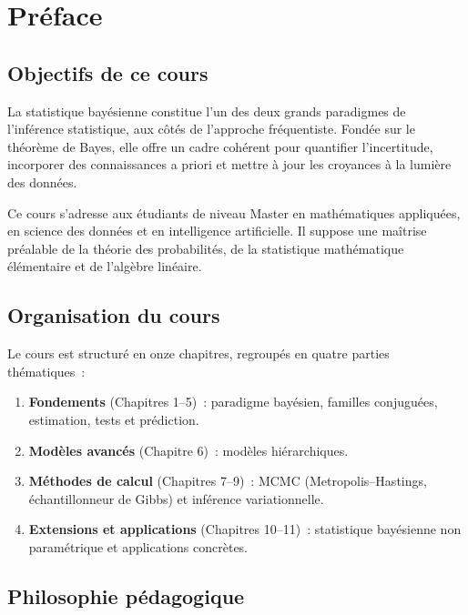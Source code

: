 \chapter*{Pr\'eface}

\section*{Objectifs de ce cours}

La statistique bay\'esienne constitue l'un des deux grands paradigmes
de l'inf\'erence statistique, aux c\^ot\'es de l'approche fr\'equentiste.
Fond\'ee sur le th\'eor\`eme de Bayes, elle offre un cadre coh\'erent
pour quantifier l'incertitude, incorporer des connaissances a priori
et mettre \`a jour les croyances \`a la lumi\`ere des donn\'ees.

Ce cours s'adresse aux \'etudiants de niveau Master en math\'ematiques
appliqu\'ees, en science des donn\'ees et en intelligence artificielle.
Il suppose une ma\^itrise pr\'ealable de la th\'eorie des probabilit\'es,
de la statistique math\'ematique \'el\'ementaire et de l'alg\`ebre lin\'eaire.

\section*{Organisation du cours}

Le cours est structur\'e en onze chapitres, regroup\'es en quatre parties
th\'ematiques~:

\begin{enumerate}
  \item \textbf{Fondements} (Chapitres 1--5)~: paradigme bay\'esien,
        familles conjugu\'ees, estimation, tests et pr\'ediction.
  \item \textbf{Mod\`eles avanc\'es} (Chapitre 6)~: mod\`eles hi\'erarchiques.
  \item \textbf{M\'ethodes de calcul} (Chapitres 7--9)~: MCMC
        (Metropolis--Hastings, \'echantillonneur de Gibbs) et inf\'erence
        variationnelle.
  \item \textbf{Extensions et applications} (Chapitres 10--11)~:
        statistique bay\'esienne non param\'etrique et applications
        concr\`etes.
\end{enumerate}

\section*{Philosophie p\'edagogique}

